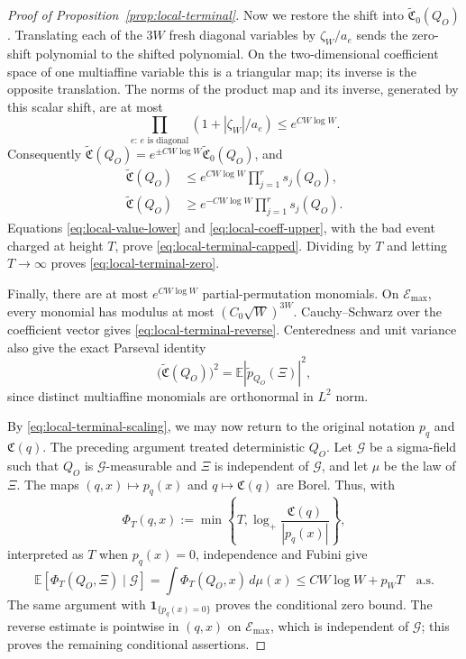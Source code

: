 \documentclass[10pt,a4paper]{amsart}
\newcommand{\E}{\mathbb E}
\begin{document}
\begin{proof}[Proof of Proposition~\ref{prop:local-terminal}]
Now we restore the shift into $\widetilde{\mathfrak C}_0(Q_O)$.  Translating each of the \(3W\) fresh diagonal
variables by \(\zeta_W/a_e\) sends the zero-shift polynomial to the
shifted polynomial.  On the two-dimensional coefficient space of one
multiaffine variable this is a triangular map; its inverse is the
opposite translation.  The norms of the product map and its inverse, generated by this scalar shift, are
at most
\[
 \prod_{e:\,e\text{ is diagonal}}(1+|\zeta_W|/a_e)
 \leq e^{CW\log W}.
\]
Consequently \(\widetilde{\mathfrak C}(Q_O)
=e^{\pm CW\log W}\widetilde{\mathfrak C}_0(Q_O)\), and
\begin{align}
 \widetilde{\mathfrak C}(Q_O)
 &\leq e^{CW\log W}\prod_{j=1}^r s_j(Q_O),
 \label{eq:local-coeff-upper}\\
 \widetilde{\mathfrak C}(Q_O)
 &\geq e^{-CW\log W}\prod_{j=1}^r s_j(Q_O).
 \label{eq:local-coeff-lower}
\end{align}
Equations \eqref{eq:local-value-lower} and
\eqref{eq:local-coeff-upper}, with the bad event charged at height \(T\),
prove \eqref{eq:local-terminal-capped}.  Dividing by \(T\) and letting
\(T\to\infty\) proves \eqref{eq:local-terminal-zero}.

Finally, there are at most \(e^{CW\log W}\) partial-permutation monomials.
On \(\mathcal E_{\max}\), every monomial has modulus at most
\((C_0\sqrt W)^{3W}\).
Cauchy--Schwarz over the coefficient vector gives
\eqref{eq:local-terminal-reverse}.  Centeredness and unit variance also
give the exact Parseval identity
\begin{equation}
 \bigl(\widetilde{\mathfrak C}(Q_O)\bigr)^2
 =\E|\widetilde p_{Q_O}(\Xi)|^2,
 \label{eq:local-parseval}
\end{equation}
since distinct multiaffine monomials are orthonormal in \(L^2\) norm.

By \eqref{eq:local-terminal-scaling}, we may now return to the original
notation $p_q$ and $\mathfrak C(q)$.  The preceding argument treated
deterministic \(Q_O\).  Let \(\mathcal G\)
be a sigma-field such that \(Q_O\) is \(\mathcal G\)-measurable and
\(\Xi\) is independent of \(\mathcal G\), and let \(\mu\) be the law of
\(\Xi\).  The maps \((q,x)\mapsto p_q(x)\) and
\(q\mapsto\mathfrak C(q)\) are Borel.  Thus, with
\[
 \Phi_T(q,x):=\min\left\{T,
   \log_+\frac{\mathfrak C(q)}{|p_q(x)|}\right\},
\]
interpreted as \(T\) when \(p_q(x)=0\), independence and Fubini give
\[
 \E[\Phi_T(Q_O,\Xi)\mid\mathcal G]
 =\int\Phi_T(Q_O,x)\,d\mu(x)
 \leq CW\log W+p_WT
 \quad\text{a.s.}
\]
The same argument with \(\mathbf1_{\{p_q(x)=0\}}\) proves the conditional
zero bound.  The reverse estimate is pointwise in \((q,x)\) on
\(\mathcal E_{\max}\), which is independent of \(\mathcal G\); this
proves the remaining conditional assertions.
\end{proof}
\end{document}
